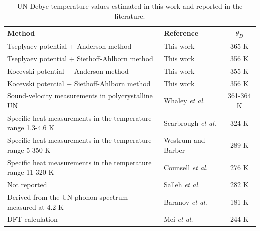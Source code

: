\documentclass[preprint, 12pt]{elsarticle}
\begin{document}
\begin{table}[h!]
    \centering
    \footnotesize    
    \caption{UN Debye temperature values estimated in this work and reported in the literature.}
    \begin{tabular}{llc}
    \hline
    Method                                  & Reference & $\theta_{D}$ \\
    \hline
    Tseplyaev potential + Anderson method             & This work & 365 K \\
    Tseplyaev potential + Siethoff-Ahlborn method     & This work & 356 K \\ 
    Kocevski potential + Anderson method              & This work & 355 K \\
    Kocevski potential + Siethoff-Ahlborn method      & This work & 356 K \\
    \hline
    Sound-velocity measurements in polycrystalline UN             & Whaley \textit{et al.} \cite{Whaley1969}     & 361-364 K \\
    Specific heat measurements in the temperature range 1.3-4.6 K & Scarbrough \textit{et al.} \cite{Scarbrough1968} & 324 K \\
    Specific heat measurements in the temperature range 5-350 K   & Westrum and Barber \cite{Westrum1966}   & 289 K \\
    Specific heat measurements in the temperature range 11-320 K  & Counsell \textit{et al.} \cite{Counsell1964}     & 276 K \\
    Not reported                                          & Salleh \textit{et al.} \cite{Salleh1986}   & 282 K \\
    Derived from the UN phonon spectrum measured at 4.2 K & Baranov \textit{et al.} \cite{Baranov2013} & 181 K \\
    DFT calculation                                       & Mei \textit{et al.} \cite{Mei2013}         & 244 K \\
    \hline
    \end{tabular}
    \label{Tab:Debye}
\end{table}
\end{document}
